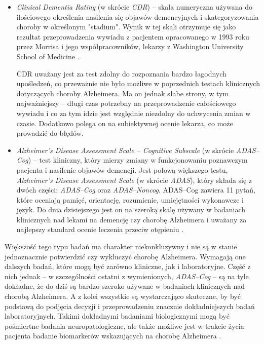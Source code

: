 \begin{itemize}
  \item \emph{Clinical Dementia Rating} (w skrócie \emph{CDR}) -- skala numeryczna używana do ilościowego określenia nasilenia się objawów demencyjnych i skategoryzowania choroby w określonym "stadium".
        Wynik w tej skali otrzymuje się jako rezultat przeprowadzenia wywiadu z pacjentem opracowanego w 1993 roku przez Morrisa i jego współpracowników, lekarzy z Washington University School of Medicine \cite{morris1993clinical}.

        CDR uważany jest za test zdolny do rozpoznania bardzo łagodnych upośledzeń, co przeważnie nie było możliwe w poprzednich testach klinicznych dotyczących choroby Alzheimera.
        Ma on jednak słabe strony, w tym najważniejszy -- długi czas potrzebny na przeprowadzenie całościowego wywiadu i co za tym idzie jest względnie niezdolny do uchwycenia zmian w czasie.
        Dodatkowo polega on na subiektywnej ocenie lekarza, co może prowadzić do błędów.

  \item \emph{Alzheimer's Disease Assessment Scale -- Cognitive Subscale} (w skrócie \emph{ADAS--Cog}) -- test kliniczny, który mierzy zmiany w funkcjonowaniu poznawczym pacjenta i nasilenie objawów demencji.
        Jest połową większego testu, \emph{Alzheimer's Disease Assessment Scale} (w skrócie \emph{ADAS}), który składa się z dwóch części: \emph{ADAS--Cog} oraz \emph{ADAS--Noncog}.
        ADAS--Cog zawiera 11 pytań, które oceniają pamięć, orientację, rozumienie, umiejętności wykonawcze i język.
        Do dnia dzisiejszego jest on na szeroką skalę używany w badaniach klinicznych nad lekami na demencję czy chorobę Alzheimera i uważany za najlepszy standard  ocenie leczenia przeciw otępieniu \cite{connor2008administration}.

\end{itemize}

Większość tego typu badań ma charakter niekonkluzywny i nie są w stanie jednoznacznie potwierdzić czy wykluczyć chorobę Alzheimera.
Wymagają one dalszych badań, które mogą być zarówno kliniczne, jak i laboratoryjne.
Część z nich jednak -- w szczególności ostatni z wymienionych, \emph{ADAS--Cog} -- są na tyle dokładne, że do dziś są bardzo szeroko używane w badaniach klinicznych nad chorobą Alzheimera.
A z kolei wszystkie są wystarczająco skuteczne, by być podstawą do podjęcia decyzji i przeprowadzeniu znacznie dokładniejszych badań laboratoryjnych.
Takimi dokładnymi badaniami biologicznymi mogą być pośmiertne badania neuropatologiczne, ale także możliwe jest w trakcie życia pacjenta badanie biomarkerów wskazujących na chorobę Alzheimera \cite{mantzavinos2017biomarkers}.

